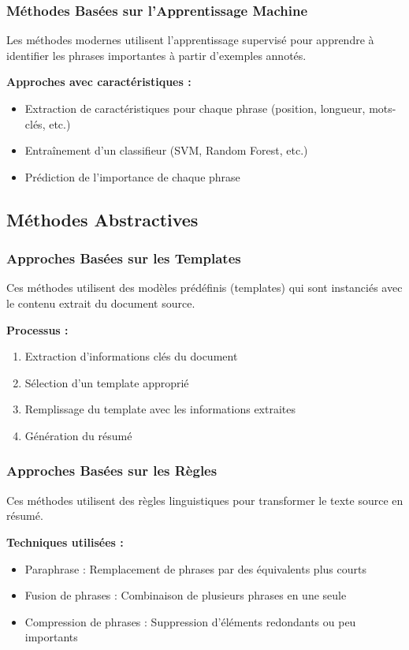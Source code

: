 \subsubsection{Méthodes Basées sur l'Apprentissage Machine}

Les méthodes modernes utilisent l'apprentissage supervisé pour apprendre à identifier les phrases importantes à partir d'exemples annotés.

\textbf{Approches avec caractéristiques :}
\begin{itemize}
    \item Extraction de caractéristiques pour chaque phrase (position, longueur, mots-clés, etc.)
    \item Entraînement d'un classifieur (SVM, Random Forest, etc.)
    \item Prédiction de l'importance de chaque phrase
\end{itemize}

\subsection{Méthodes Abstractives}

\subsubsection{Approches Basées sur les Templates}

Ces méthodes utilisent des modèles prédéfinis (templates) qui sont instanciés avec le contenu extrait du document source.

\textbf{Processus :}
\begin{enumerate}
    \item Extraction d'informations clés du document
    \item Sélection d'un template approprié
    \item Remplissage du template avec les informations extraites
    \item Génération du résumé
\end{enumerate}

\subsubsection{Approches Basées sur les Règles}

Ces méthodes utilisent des règles linguistiques pour transformer le texte source en résumé.

\textbf{Techniques utilisées :}
\begin{itemize}
    \item Paraphrase : Remplacement de phrases par des équivalents plus courts
    \item Fusion de phrases : Combinaison de plusieurs phrases en une seule
    \item Compression de phrases : Suppression d'éléments redondants ou peu importants
\end{itemize}


